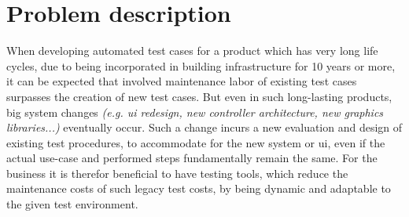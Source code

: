 \documentclass[Bachelor, BIC, english, fhCitStyle, IEEE]{BASE/twbook} %
\begin{document}
\chapter{Problem description}
When developing automated test cases for a product which has very long life cycles, due to being incorporated in building infrastructure for 10 years or more, it can be expected that involved maintenance labor of existing test cases surpasses the creation of new test cases. But even in such long-lasting products, big system changes \textit{(e.g. \ac{ui} redesign, new controller architecture, new graphics libraries...)} eventually occur. Such a change incurs a new evaluation and design of existing test procedures, to accommodate for the new system or \ac{ui}, even if the actual use-case and performed steps fundamentally remain the same.
For the business it is therefor beneficial to have testing tools, which reduce the maintenance costs of such legacy test costs, by being dynamic and adaptable to the given test environment.\\
\end{document}

